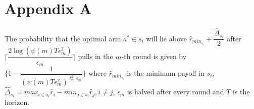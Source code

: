 
\appendix




\section*{Appendix A}
\begin{proposition}
The probability that the optimal arm $a^{*}\in s_{i}$ will lie above $\hat{r}_{min_{s_{i}}}+ \dfrac{\hat{\Delta}_{s_{i}}}{2}$ after $\bigg\lceil\dfrac{2\log (\psi(m)T\epsilon_{m}^{2})}{\epsilon_{m}}\bigg\rceil$ pulls in the $m$-th round is given by $\bigg\lbrace 1- \dfrac{1}{(\psi(m)T\epsilon_{m}^{2})^{\ell_{m}^{2}\epsilon_{m}}} \bigg\rbrace$ where $\hat{r}_{min_{s_{i}}}$ is the minimum payoff in $s_{i}$, $\hat{\Delta}_{s_{i}}=max_{i\in s_{i}}\hat{r}_{i}-min_{j\in s_{i}}\hat{r}_{j}, i\neq j$, $\epsilon_{m}$ is halved after every round and $T$ is the horizon. 
\end{proposition}


